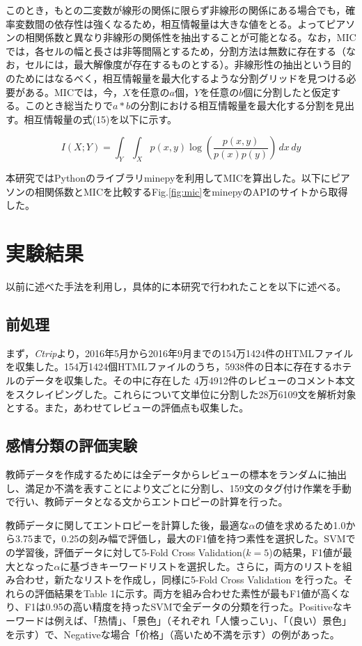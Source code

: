 \documentclass[review]{elsarticle}
\begin{document}
\begin{CJK}{UTF8}{min}
このとき，もとの二変数が線形の関係に限らず非線形の関係にある場合でも，確率変数間の依存性は強くなるため，相互情報量は大きな値をとる。よってピアソンの相関係数と異なり非線形の関係性を抽出することが可能となる。なお，MICでは，各セルの幅と長さは非等間隔とするため，分割方法は無数に存在する（なお，セルには，最大解像度が存在するものとする）。非線形性の抽出という目的のためにはなるべく，相互情報量を最大化するような分割グリッドを見つける必要がある。MICでは，今，\(X\)を任意の\(a\)個，\(Y\)を任意の\(b\)個に分割したと仮定する。このとき総当たりで\(a*b\)の分割における相互情報量を最大化する分割を見出す。相互情報量の式(15)を以下に示す。

\begin{equation}
I(X;Y) = \int_{Y}{\int_{X}{p(x,y)\log(\frac{p(x,y)}{p(x)p(y)})}\,dx}\,dy
\end{equation}

本研究ではPythonのライブラリminepy\cite[][]{Albanese2012}を利用してMICを算出した。以下にピアソンの相関係数とMICを比較するFig.\ref{fig:mic}をminepyのAPIのサイトから取得した。

\section{実験結果}\label{results}

以前に述べた手法を利用し，具体的に本研究で行われたことを以下に述べる。

\subsection{前処理}\label{res_preprocessing}

まず，\textit{Ctrip}より，2016年5月から2016年9月までの154万1424件のHTMLファイルを収集した。154万1424個HTMLファイルのうち，5938件の日本に存在するホテルのデータを収集した。その中に存在した 4万4912件のレビューのコメント本文をスクレイピングした。これらについて文単位に分割した28万6109文を解析対象とする。また，あわせてレビューの評価点も収集した。

\subsection{感情分類の評価実験}\label{res_sentiment_analysis}

教師データを作成するためには全データからレビューの標本をランダムに抽出し、満足か不満を表すことにより文ごとに分割し、159文のタグ付け作業を手動で行い、教師データとなる文からエントロピーの計算を行った。

教師データに関してエントロピーを計算した後，最適な\(\alpha\)の値を求めるため1.0から3.75まで，0.25の刻み幅で評価し，最大のF1値を持つ素性を選択した。SVMでの学習後，評価データに対して5-Fold Cross Validation(\(k = 5\))の結果，F1値が最大となった\(\alpha\)に基づきキーワードリストを選択した。さらに，両方のリストを組み合わせ，新たなリストを作成し，同様に5-Fold Cross Validation を行った。それらの評価結果をTable 1に示す。両方を組み合わせた素性が最もF1値が高くなり、F1は0.95の高い精度を持ったSVMで全データの分類を行った。Positiveなキーワードは例えば、「热情」、「景色」（それぞれ「人懐っこい」、「（良い）景色」を示す）で、Negativeな場合「价格」（高いため不満を示す）の例があった。


\end{CJK}
\end{document}
